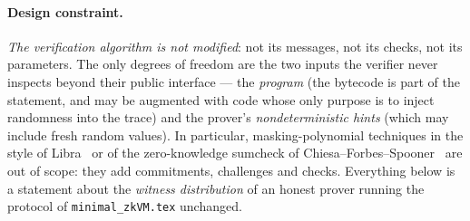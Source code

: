 \documentclass{article}
\theoremstyle{definition}
\begin{document}
\paragraph{Design constraint.} \emph{The verification algorithm is not modified}: not its messages, not its checks, not its parameters. The only degrees of freedom are the two inputs the verifier never inspects beyond their public interface --- the \emph{program} (the bytecode is part of the statement, and may be augmented with code whose only purpose is to inject randomness into the trace) and the prover's \emph{nondeterministic hints} (which may include fresh random values). In particular, masking-polynomial techniques in the style of Libra~\cite{libra} or of the zero-knowledge sumcheck of Chiesa--Forbes--Spooner~\cite{zk_sumcheck_cfs} are out of scope: they add commitments, challenges and checks. Everything below is a statement about the \emph{witness distribution} of an honest prover running the protocol of \texttt{minimal\_zkVM.tex} unchanged.
\end{document}
